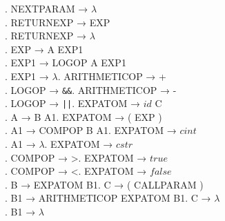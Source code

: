 \begin{tabbing}
    . NEXTPARAM → \( \lambda \)\\
    . RETURNEXP → EXP\\
    . RETURNEXP → \( \lambda \)\\
    . EXP → A EXP1\\
    . EXP1 → LOGOP A EXP1\\
    . EXP1 → \( \lambda \). ARITHMETICOP → +\\
    . LOGOP → \verb!&&!. ARITHMETICOP → -\\
    . LOGOP → \verb!||!. EXPATOM → $id$ C\\
    . A → B A1. EXPATOM → ( EXP )\\
    . A1 → COMPOP B A1. EXPATOM → $cint$\\
    . A1 → \( \lambda \). EXPATOM → $cstr$\\
    . COMPOP → >. EXPATOM → $true$\\
    . COMPOP → <. EXPATOM → $false$\\
    . B → EXPATOM B1. C → ( CALLPARAM )\\
    . B1 → ARITHMETICOP EXPATOM B1. C → \( \lambda \)\\
    . B1 → \( \lambda \)\\
\end{tabbing}